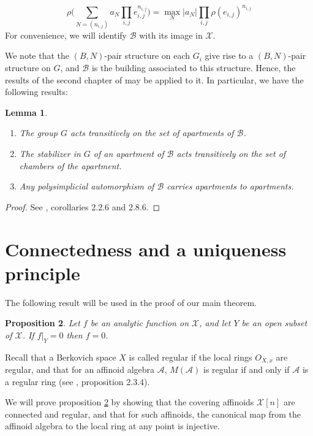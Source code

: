 \documentclass{amsart}
\theoremstyle{theorem}
\theoremstyle{lemma}
\newtheorem{lemma}{Lemma}[section]
\theoremstyle{prop}
\newtheorem{prop}[lemma]{Proposition}
\theoremstyle{definition}
\theoremstyle{corollary}
\theoremstyle{remark}
\newcommand{\AF}{\mathcal{A}}
\newcommand{\B}{\mathcal{B}}
\newcommand{\X}{\mathcal{X}}
\begin{document}
\begin{equation}
\label{embedeq}
\rho \Big(\sum_{N=(n_{i,j})} a_N \prod_{i,j}e_{i,j}^{n_{i,j}}\Big)=\max_N |a_N| \prod_{i,j}\rho(e_{i,j})^{n_{i,j}}
\end{equation}
For convenience, we will identify $\B$ with its image in $\X$.

We note that the $(B,N)$-pair structure on each $G_i$ give rise to a $(B,N)$-pair structure on $G$, and $\B$ is the building associated to this structure. Hence, the results of the second chapter of \cite{brt} may be applied to it. In particular, we have the following results:

\begin{lemma}\label{citebrt}
\begin{enumerate} 
\item The group $G$ acts transitively on the set of apartments of $\B$.
\item The stabilizer in $G$ of an apartment of $\B$ acts transitively on the set of chambers of the apartment.
\item Any polysimplicial automorphism of $\B$ carries apartments to apartments.
\end{enumerate}
\end{lemma}
\begin{proof} See \cite{brt}, corollaries 2.2.6 and 2.8.6. \end{proof}


\section{ Connectedness and a uniqueness principle }
The following result will be used in the proof of our main theorem.
\begin{prop} \label{prop:uniq}
Let $f$ be an analytic function on $\X$, and let $Y$ be an open subset of $\X$. If $f|_Y=0$ then $f=0$.
\end{prop}

Recall that a Berkovich space $X$ is called regular if the local rings $O_{X,x}$ are regular, and that for an affinoid algebra $\AF$, $M(\AF)$ is regular if and only if $\AF$ is a regular ring (see \cite{ber2}, proposition 2.3.4).

We will prove proposition \ref{prop:uniq} by showing that the covering affinoids $\X[n]$ are connected and regular, and that for such affinoids, the canonical map from the affinoid algebra to the local ring at any point is injective.
\end{document}
